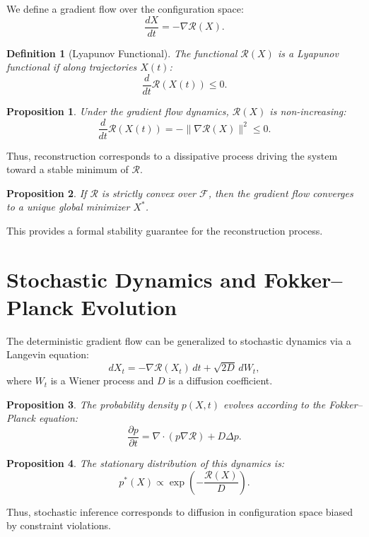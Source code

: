 \documentclass[12pt]{article}
\newtheorem{definition}{Definition}
\newtheorem{proposition}{Proposition}
\begin{document}
We define a gradient flow over the configuration space:
\[
\frac{dX}{dt} = - \nabla \mathcal{R}(X).
\]

\begin{definition}[Lyapunov Functional]
The functional $\mathcal{R}(X)$ is a Lyapunov functional if along trajectories $X(t)$:
\[
\frac{d}{dt} \mathcal{R}(X(t)) \leq 0.
\]
\end{definition}

\begin{proposition}
Under the gradient flow dynamics, $\mathcal{R}(X)$ is non-increasing:
\[
\frac{d}{dt} \mathcal{R}(X(t)) = - \|\nabla \mathcal{R}(X)\|^2 \leq 0.
\]
\end{proposition}

Thus, reconstruction corresponds to a dissipative process driving the system toward a stable minimum of $\mathcal{R}$.

\begin{proposition}
If $\mathcal{R}$ is strictly convex over $\mathcal{F}$, then the gradient flow converges to a unique global minimizer $X^*$.
\end{proposition}

This provides a formal stability guarantee for the reconstruction process.

\section{Stochastic Dynamics and Fokker--Planck Evolution}

The deterministic gradient flow can be generalized to stochastic dynamics via a Langevin equation:
\[
dX_t = -\nabla \mathcal{R}(X_t)\, dt + \sqrt{2D}\, dW_t,
\]
where $W_t$ is a Wiener process and $D$ is a diffusion coefficient.

\begin{proposition}
The probability density $p(X,t)$ evolves according to the Fokker--Planck equation:
\[
\frac{\partial p}{\partial t} = \nabla \cdot \left( p \nabla \mathcal{R} \right) + D \Delta p.
\]
\end{proposition}

\begin{proposition}
The stationary distribution of this dynamics is:
\[
p^*(X) \propto \exp\!\left(-\frac{\mathcal{R}(X)}{D}\right).
\]
\end{proposition}

Thus, stochastic inference corresponds to diffusion in configuration space biased by constraint violations.
\end{document}

